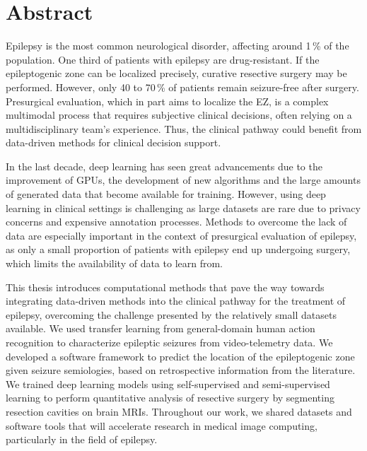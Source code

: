 \chapter{Abstract}


Epilepsy is the most common neurological disorder, affecting around 1\,\% of the population.
One third of patients with epilepsy are drug-resistant.
If the epileptogenic zone can be localized precisely, curative resective surgery may be performed.
However, only 40 to 70\,\% of patients remain seizure-free after surgery.
Presurgical evaluation, which in part aims to localize the \ac{EZ}, is a complex multimodal process that requires subjective clinical decisions, often relying on a multidisciplinary team's experience.
Thus, the clinical pathway could benefit from data-driven methods for clinical decision support.

In the last decade, deep learning has seen great advancements due to the improvement of \acp{GPU}, the development of new algorithms and the large amounts of generated data that become available for training.
However, using deep learning in clinical settings is challenging as large datasets are rare due to privacy concerns and expensive annotation processes.
Methods to overcome the lack of data are especially important in the context of presurgical evaluation of epilepsy, as only a small proportion of patients with epilepsy end up undergoing surgery, which limits the availability of data to learn from.

This thesis introduces computational methods that pave the way towards integrating data-driven methods into the clinical pathway for the treatment of epilepsy, overcoming the challenge presented by the relatively small datasets available.
We used transfer learning from general-domain human action recognition to characterize epileptic seizures from video-telemetry data.
We developed a software framework to predict the location of the epileptogenic zone given seizure semiologies, based on retrospective information from the literature.
We trained deep learning models using self-supervised and semi-supervised learning to perform quantitative analysis of resective surgery by segmenting resection cavities on brain \acp{MRI}.
Throughout our work, we shared datasets and software tools that will accelerate research in medical image computing, particularly in the field of epilepsy.
